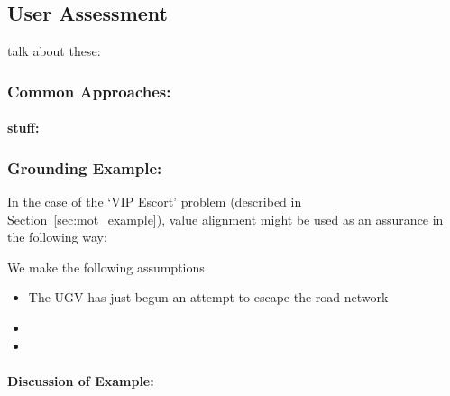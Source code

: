 \subsection{User Assessment} \label{sec:user_assessment}
talk about these: \citet{Yu2018-qw, Wickens1999-la, Riley1996-qm, Muir1996-gt, Desai2012-rc}
\subsubsection{Common Approaches:}

\paragraph{stuff:}


\subsubsection{Grounding Example:}
In the case of the `VIP Escort' problem (described in Section~\ref{sec:mot_example}), value alignment might be used as an assurance in the following way:

We make the following assumptions

\begin{itemize}
    \item The UGV has just begun an attempt to escape the road-network
    \item 
    \item 
\end{itemize}

\paragraph{\textbf{Discussion of Example:}} 
